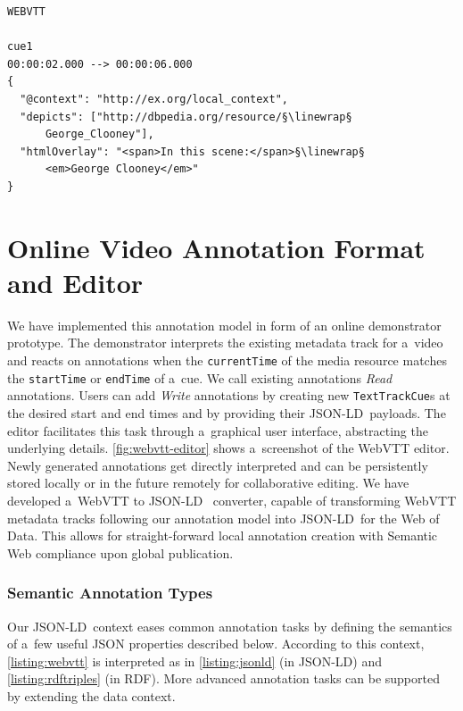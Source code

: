 \documentclass[runningheads,a4paper]{llncs}
\newcommand{\linewrap}{\raisebox{-.6ex}{\textcolor{grey}{$\hookleftarrow$}}}
\def\JSONLD{\mbox{JSON-LD}}
\def\JSONLD{\mbox{JSON-LD}}
\begin{document}
\begin{lstlisting}[caption={WebVTT annotations analog to \autoref{listing:popcorn}},
  label=listing:webvttclooney, float=t!]
WEBVTT

cue1
00:00:02.000 --> 00:00:06.000
{
  "@context": "http://ex.org/local_context",
  "depicts": ["http://dbpedia.org/resource/§\linewrap§
      George_Clooney"],
  "htmlOverlay": "<span>In this scene:</span>§\linewrap§
      <em>George Clooney</em>"
}
\end{lstlisting}

\section{Online Video Annotation Format and Editor}
\label{sec:online-video-annotation-format-and-editor}

We have implemented this annotation model
in form of an online demonstrator prototype.
The demonstrator interprets the existing metadata track for a~video
and reacts on annotations when the \texttt{currentTime}
of the media resource matches the
\texttt{startTime} or \texttt{endTime} of a~cue.
We call existing annotations \emph{Read} annotations.
Users can add \emph{Write} annotations
by creating new \texttt{TextTrackCue}s
at the desired start and end times
and by providing their \JSONLD~payloads.
The editor facilitates this task through a~graphical user interface, abstracting the underlying details.
\autoref{fig:webvtt-editor} shows a~screenshot of the WebVTT editor.
Newly generated annotations get directly interpreted
and can be persistently stored locally
or in the future remotely for collaborative editing.
We have developed a~WebVTT to \JSONLD~%
converter, capable of transforming WebVTT metadata tracks
following our annotation model
into \JSONLD~for the Web of Data.
This allows for straight-forward local annotation creation
with Semantic Web compliance upon global publication.

\subsubsection{Semantic Annotation Types}

Our \JSONLD\ context eases common annotation tasks
by defining the semantics of a~few useful JSON properties described below.
According to this context, \autoref{listing:webvtt} is interpreted as in
\autoref{listing:jsonld} (in \JSONLD) and \autoref{listing:rdftriples} (in RDF).
More advanced annotation tasks can be supported by extending the data context.
\end{document}
